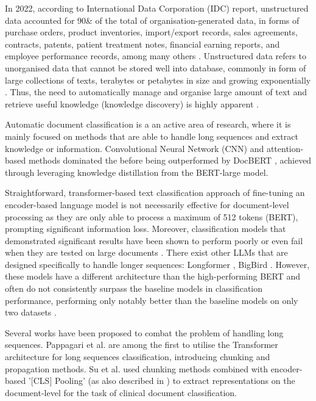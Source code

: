 In 2022, according to International Data Corporation (IDC) report, unstructured data accounted for 90\& of the total of organisation-generated data, in forms of purchase orders, product inventories, import/export records, sales agreements, contracts, patents, patient treatment notes, financial earning reports, and employee performance records, among many others \cite{box-2023-untapped}. Unstructured data refers to unorganised data that cannot be stored well into database, commonly in form of large collections of texts, terabytes or petabytes in size and growing exponentially \cite{mishra-2017-structured-unstructured}. Thus, the need to automatically manage and organise large amount of text and retrieve useful knowledge (knowledge discovery) is highly apparent \cite{mali-2021-relevance-of-preprocessing}.

Automatic document classification is a an active area of research, where it is mainly focused on methods that are able to handle long sequences and extract knowledge or information. Convolutional Neural Network (CNN) \cite{afzal-deepdocclassifier,liu-2017-xmlcnn} and attention-based methods \cite{yang-2016-han} dominated the before being outperformed by DocBERT \cite{adhikari-2019-docbert}, achieved through leveraging knowledge distillation from the BERT-large model.

Straightforward, transformer-based text classification approach of fine-tuning an encoder-based language model is not necessarily effective for document-level processing as they are only able to process a maximum of 512 tokens (BERT), prompting significant information loss. Moreover, classification models that demonstrated significant results have been shown to perform poorly or even fail when they are tested on large documents \cite{wan-2019-long-length}. There exist other LLMs that are designed specifically to handle longer sequences: Longformer \cite{beltagy-2020-longformer}, BigBird \cite{zaheer-2021-bigbird}. However, these models have a different architecture than the high-performing BERT and often do not consistently surpass the baseline models in classification performance, performing only notably better than the baseline models on only two datasets \cite{park-2022-efficient}.

Several works have been proposed to combat the problem of handling long sequences. Pappagari et al. \cite{pappagari-2019-hierarchical} are among the first to utilise the Transformer architecture for long sequences classification, introducing chunking and propagation methods. Su et al. \cite{su-2021-classifying} used chunking methods combined with encoder-based '[CLS] Pooling' (as also described in \cite{adhikari-2019-docbert}) to extract representations on the document-level for the task of clinical document classification.


